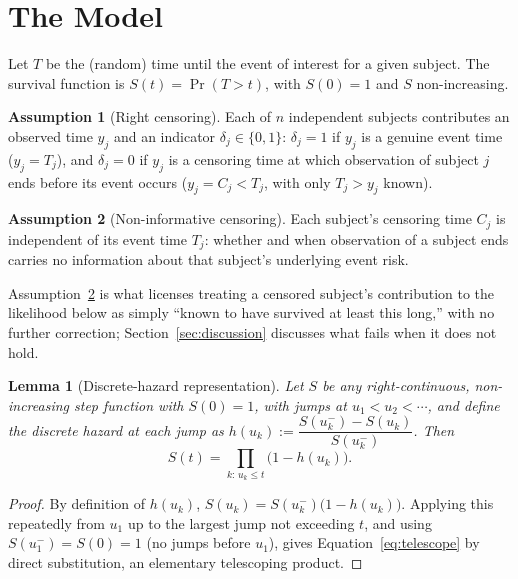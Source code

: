 \documentclass[11pt]{article}
\newtheorem{lemma}{Lemma}
\theoremstyle{remark}
\theoremstyle{definition}
\newtheorem*{assumption}{Assumption}
\begin{document}
\section{The Model}
\label{sec:model}

Let $T$ be the (random) time until the event of interest for a given subject. The survival function is $S(t)=\Pr(T>t)$, with $S(0)=1$ and $S$ non-increasing.

\begin{assumption}[Right censoring]
\label{ass:censoring}
Each of $n$ independent subjects contributes an observed time $y_j$ and an indicator $\delta_j\in\{0,1\}$: $\delta_j=1$ if $y_j$ is a genuine event time ($y_j=T_j$), and $\delta_j=0$ if $y_j$ is a censoring time at which observation of subject $j$ ends before its event occurs ($y_j=C_j<T_j$, with only $T_j>y_j$ known).
\end{assumption}

\begin{assumption}[Non-informative censoring]
\label{ass:noninformative}
Each subject's censoring time $C_j$ is independent of its event time $T_j$: whether and when observation of a subject ends carries no information about that subject's underlying event risk.
\end{assumption}

Assumption~\ref{ass:noninformative} is what licenses treating a censored subject's contribution to the likelihood below as simply ``known to have survived at least this long,'' with no further correction; Section~\ref{sec:discussion} discusses what fails when it does not hold.

\begin{lemma}[Discrete-hazard representation]
\label{lem:telescope}
Let $S$ be any right-continuous, non-increasing step function with $S(0)=1$, with jumps at $u_1<u_2<\cdots$, and define the discrete hazard at each jump as $h(u_k) := \dfrac{S(u_k^{-})-S(u_k)}{S(u_k^{-})}$. Then
\begin{equation}
S(t) = \prod_{k:\,u_k\le t}\big(1-h(u_k)\big).
\label{eq:telescope}
\end{equation}
\end{lemma}
\begin{proof}
By definition of $h(u_k)$, $S(u_k) = S(u_k^{-})\big(1-h(u_k)\big)$. Applying this repeatedly from $u_1$ up to the largest jump not exceeding $t$, and using $S(u_1^-)=S(0)=1$ (no jumps before $u_1$), gives Equation~\eqref{eq:telescope} by direct substitution, an elementary telescoping product.
\end{proof}
\end{document}
